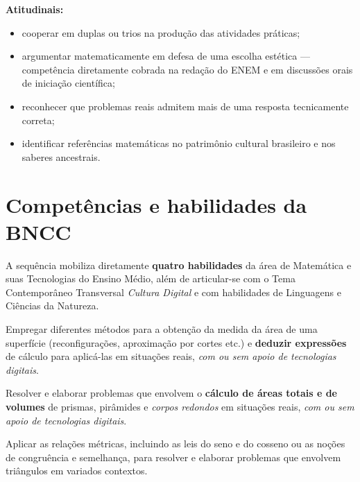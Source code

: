 \documentclass[12pt,a4paper]{scrartcl}
\newcommand{\acc}[1]{\textcolor{accent}{\textbf{#1}}}
\begin{document}
\textbf{Atitudinais:}
\begin{itemize}[leftmargin=1.3em,itemsep=0.2em,topsep=0.3em]
  \item cooperar em duplas ou trios na produção das atividades práticas;
  \item argumentar matematicamente em defesa de uma escolha estética --- competência diretamente cobrada na redação do ENEM e em discussões orais de iniciação científica;
  \item reconhecer que problemas reais admitem mais de uma resposta tecnicamente correta;
  \item identificar referências matemáticas no patrimônio cultural brasileiro e nos saberes ancestrais.
\end{itemize}

\section{Competências e habilidades da BNCC}\label{sec:bncc}

A sequência mobiliza diretamente \acc{quatro habilidades} da área de Matemática e suas Tecnologias do Ensino Médio, além de articular-se com o Tema Contemporâneo Transversal \emph{Cultura Digital} e com habilidades de Linguagens e Ciências da Natureza.

\begin{habilidade}[EM13MAT307]
Empregar diferentes métodos para a obtenção da medida da área de uma superfície (reconfigurações, aproximação por cortes etc.) e \acc{deduzir expressões} de cálculo para aplicá-las em situações reais, \emph{com ou sem apoio de tecnologias digitais}.
\end{habilidade}

\begin{habilidade}[EM13MAT309]
Resolver e elaborar problemas que envolvem o \acc{cálculo de áreas totais e de volumes} de prismas, pirâmides e \emph{corpos redondos} em situações reais, \emph{com ou sem apoio de tecnologias digitais}.
\end{habilidade}

\begin{habilidade}[EM13MAT308]
Aplicar as relações métricas, incluindo as leis do seno e do cosseno ou as noções de congruência e semelhança, para resolver e elaborar problemas que envolvem triângulos em variados contextos.
\end{habilidade}
\end{document}
